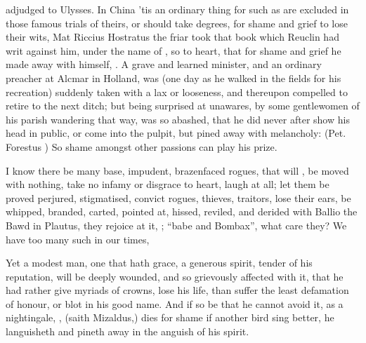 adjudged to Ulysses. In China 'tis an ordinary thing for such as are excluded
in those famous trials of theirs, or should take degrees, for shame and grief
to lose their wits, Mat Riccius
 Hostratus the friar took
that book which Reuclin had writ against him, under the name of
, so to heart, that for shame
and grief he made away with himself, . A grave and learned minister, and an ordinary preacher at Alcmar in
Holland, was (one day as he walked in the fields for his recreation) suddenly
taken with a lax or looseness, and thereupon compelled to retire to the next
ditch; but being surprised at unawares, by some
gentlewomen of his parish wandering that way, was so abashed, that he did never
after show his head in public, or come into the pulpit, but pined away with
melancholy: (Pet. Forestus ) So shame amongst other passions can play his prize.

I know there be many base, impudent, brazenfaced rogues, that will
, be moved with nothing, take
no infamy or disgrace to heart, laugh at all; let them be proved perjured,
stigmatised, convict rogues, thieves, traitors, lose their ears, be whipped,
branded, carted, pointed at, hissed, reviled, and derided with
Ballio the Bawd in Plautus, they rejoice at it,
; \enquote{babe and Bombax}, what care they? We have too many such
in our times,


Yet a modest man, one that hath grace, a generous spirit, tender of his
reputation, will be deeply wounded, and so grievously affected with it, that he
had rather give myriads of crowns, lose his life, than suffer the least
defamation of honour, or blot in his good name. And if so be that he cannot
avoid it, as a nightingale, , (saith
Mizaldus,) dies for shame if another bird sing better, he
languisheth and pineth away in the anguish of his spirit.

